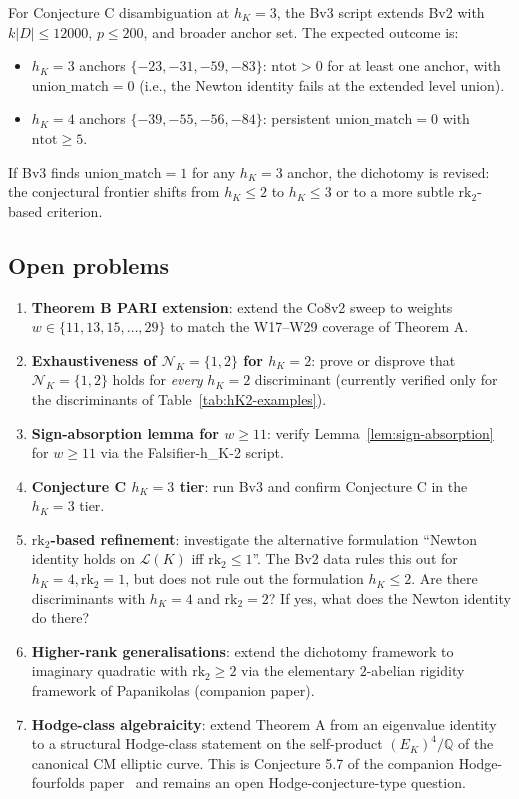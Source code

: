 \documentclass[11pt,a4paper]{amsart}
\theoremstyle{definition}
\newcommand{\Q}{\mathbb{Q}}
\newcommand{\Lcal}{\mathcal{L}}
\newcommand{\Ncal}{\mathcal{N}}
\newcommand{\hK}{h_{K}}
\begin{document}
For Conjecture C disambiguation at $\hK = 3$, the Bv3 script extends Bv2 with $k|D| \le 12000$, $p \le 200$, and broader anchor set. The expected outcome is:
\begin{itemize}[leftmargin=2em]
  \item $\hK = 3$ anchors $\{-23, -31, -59, -83\}$: $\mathrm{ntot} > 0$ for at least one anchor, with $\mathrm{union\_match} = 0$ (i.e., the Newton identity fails at the extended level union).
  \item $\hK = 4$ anchors $\{-39, -55, -56, -84\}$: persistent $\mathrm{union\_match} = 0$ with $\mathrm{ntot} \ge 5$.
\end{itemize}

If Bv3 finds $\mathrm{union\_match} = 1$ for any $\hK = 3$ anchor, the dichotomy is revised: the conjectural frontier shifts from $\hK \le 2$ to $\hK \le 3$ or to a more subtle $\mathrm{rk}_2$-based criterion.

\subsection{Open problems}\label{sec:open-problems}

\begin{enumerate}[leftmargin=2em]
  \item \textbf{Theorem B PARI extension}: extend the Co8v2 sweep to weights $w \in \{11, 13, 15, \ldots, 29\}$ to match the W17--W29 coverage of Theorem A.
  \item \textbf{Exhaustiveness of $\Ncal_K = \{1, 2\}$ for $\hK = 2$}: prove or disprove that $\Ncal_K = \{1, 2\}$ holds for \emph{every} $\hK = 2$ discriminant (currently verified only for the discriminants of Table~\ref{tab:hK2-examples}).
  \item \textbf{Sign-absorption lemma for $w \ge 11$}: verify Lemma~\ref{lem:sign-absorption} for $w \ge 11$ via the Falsifier-h\_K-2 script.
  \item \textbf{Conjecture C $\hK = 3$ tier}: run Bv3 and confirm Conjecture C in the $\hK = 3$ tier.
  \item \textbf{$\mathrm{rk}_2$-based refinement}: investigate the alternative formulation ``Newton identity holds on $\Lcal(K)$ iff $\mathrm{rk}_2 \le 1$''. The Bv2 data rules this out for $\hK = 4, \mathrm{rk}_2 = 1$, but does not rule out the formulation $\hK \le 2$. Are there discriminants with $\hK = 4$ and $\mathrm{rk}_2 = 2$? If yes, what does the Newton identity do there?
  \item \textbf{Higher-rank generalisations}: extend the dichotomy framework to imaginary quadratic with $\mathrm{rk}_2 \ge 2$ via the elementary $2$-abelian rigidity framework of Papanikolas (companion paper).
  \item \textbf{Hodge-class algebraicity}: extend Theorem A from an eigenvalue identity to a structural Hodge-class statement on the self-product $(E_K)^4 / \Q$ of the canonical CM elliptic curve. This is Conjecture 5.7 of the companion Hodge-fourfolds paper~\cite{HodgeFourfolds2026} and remains an open Hodge-conjecture-type question.
\end{enumerate}
\end{document}
